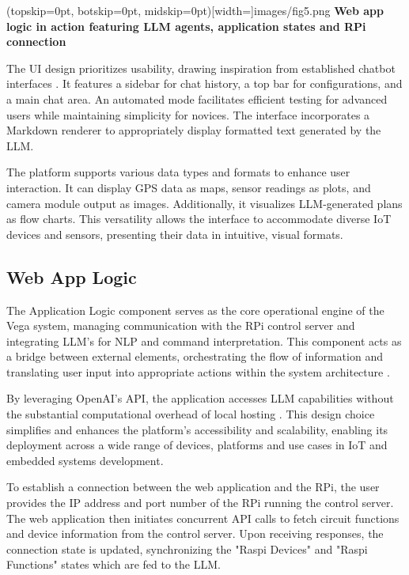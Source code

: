 \documentclass{ieeeaccess}
\begin{document}
\Figure[t!](topskip=0pt, botskip=0pt,
midskip=0pt)[width=\textwidth]{{images/fig5.png}}
{ \centering \textbf{Web app logic in action featuring LLM agents, application states and RPi connection}\label{fig5}}

The UI design prioritizes usability, drawing inspiration from established chatbot interfaces \cite{OpenAI_GPT}. It features a sidebar for chat history, a top bar for configurations, and a main chat area. An automated mode facilitates efficient testing for advanced users while maintaining simplicity for novices. The interface incorporates a Markdown renderer to appropriately display formatted text generated by the LLM.

The platform supports various data types and formats to enhance user interaction. It can display GPS data as maps, sensor readings as plots, and camera module output as images. Additionally, it visualizes LLM-generated plans as flow charts. This versatility allows the interface to accommodate diverse IoT devices and sensors, presenting their data in intuitive, visual formats.

\subsection{Web App Logic}
The Application Logic component serves as the core operational engine of the Vega system, managing communication with the RPi control server and integrating LLM's for NLP and command interpretation. This component acts as a bridge between external elements, orchestrating the flow of information and translating user input into appropriate actions within the system architecture \cite{taylor2010software}.

By leveraging OpenAI's API, the application accesses LLM capabilities without the substantial computational overhead of local hosting \cite{kim2024llmemestimatinggpumemory}. This design choice simplifies and enhances the platform's accessibility and scalability, enabling its deployment across a wide range of devices, platforms and use cases in IoT and embedded systems development.

To establish a connection between the web application and the RPi, the user provides the IP address and port number of the RPi running the control server. The web application then initiates concurrent API calls to fetch circuit functions and device information from the control server. Upon receiving responses, the connection state is updated, synchronizing the "Raspi Devices" and "Raspi Functions" states which are fed to the LLM.
\end{document}
